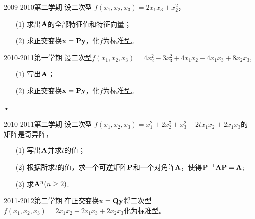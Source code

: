  \begin{frame}
   \begin{footnotesize}
    \begin{exampleblock}{2009-2010第二学期}
      设二次型
      $
      f(x_1,x_2,x_3)=2x_1x_3+x_2^2
      $，\begin{itemize}
\item[(1)] 求出$\mathbf{A}$的全部特征值和特征向量；
\item[(2)] 求正交变换$\mathbf{x}=\mathbf{P}\mathbf{y}$，化$f$为标准型。
\end{itemize}      
    \end{exampleblock}

   \begin{exampleblock}{2010-2011第一学期}
      设二次型$f(x_1,x_2,x_3)=4x_2^2-3x_3^2+4x_1x_2-4x_1x_3+8x_2x_3$,      
\begin{itemize}
\item[(1)] 写出$\mathbf{A}$；
\item[(2)] 求正交变换$\mathbf{x}=\mathbf{P}\mathbf{y}$，化$f$为标准型。
\end{itemize}•
    \end{exampleblock}
  \end{footnotesize}
\end{frame}


\begin{frame}
   \begin{footnotesize}

    \begin{exampleblock}{2010-2011第二学期}
      设二次型
      $
      f(x_1,x_2,x_3)=x_1^2+2x_2^2+x_3^2+2tx_1x_2+2x_1x_3
      $的矩阵是奇异阵，
\begin{itemize}
\item[(1)] 写出$\mathbf{A}$并求$t$的值；
\item[(2)] 根据所求$t$的值，求一个可逆矩阵$\mathbf{P}$和一个对角阵$\mathbf{\Lambda}$，使得$\mathbf{P}^{-1}\mathbf{A}\mathbf{P}=\mathbf{\Lambda}$;
\item[(3)] 求$\mathbf{A}^n(n\ge 2)$.
\end{itemize}      
    \end{exampleblock}

   \begin{exampleblock}{2011-2012第二学期}
      在正交变换$\mathbf{x}=\mathbf{Q}\mathbf{y}$将二次型$f(x_1,x_2,x_3)=2x_1x_2+2x_1x_3+2x_2x_3$化为标准型。
    \end{exampleblock}
  \end{footnotesize}
\end{frame}

